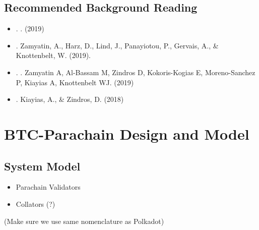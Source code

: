 \documentclass[letterpaper,10pt,english]{sphinxmanual}
\begin{document}
\section{Recommended Background Reading}
\label{\detokenize{chain-relays:recommended-background-reading}}\begin{itemize}
\item {} 
. . (2019)

\item {} 
.  Zamyatin, A., Harz, D., Lind, J., Panayiotou, P., Gervais, A., \& Knottenbelt, W. (2019).

\item {} 
. . Zamyatin A, Al-Bassam M, Zindros D, Kokoris-Kogias E, Moreno-Sanchez P, Kiayias A, Knottenbelt WJ. (2019)

\item {} 
.  Kiayias, A., \& Zindros, D. (2018)

\end{itemize}


\chapter{BTC-Parachain Design and Model}
\label{\detokenize{btc-relay:btc-parachain-design-and-model}}\label{\detokenize{btc-relay::doc}}

\section{System Model}
\label{\detokenize{btc-relay:system-model}}\begin{itemize}
\item {} 
Parachain Validators

\item {} 
Collators (?)

\end{itemize}

(Make sure we use same nomenclature as Polkadot)
\end{document}
